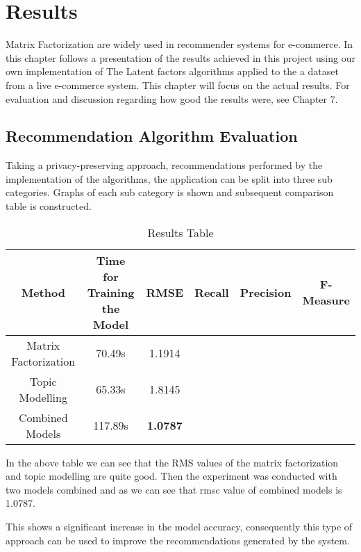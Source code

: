 \chapter{Results}
Matrix Factorization are widely used in recommender systems for e-commerce. In this chapter follows a presentation of the results achieved in this project using our own implementation of The Latent factors algorithms applied to the a dataset from a live e-commerce system. This chapter will focus on the actual results. For evaluation and discussion regarding how good the results were, see Chapter 7.

\section{Recommendation Algorithm Evaluation}
Taking a privacy-preserving approach, recommendations performed by the implementation of the algorithms, the application can be split into three sub categories. Graphs of each sub category is shown and subsequent comparison table is constructed.


\begin{table}[h]
\centering
\begin{tabular}{| c | c | c | c | c | c |}
\hline
\textbf{Method} & \textbf{Time for Training the Model} & \textbf{RMSE} & \textbf{Recall} & \textbf{Precision} & \textbf{F-Measure} \\
\hline
Matrix Factorization & 70.49s & 1.1914 &  &    &   \\
\hline
Topic Modelling & 65.33s & 1.8145 &  &  &  \\
\hline
Combined Models & 117.89s  & \textbf{1.0787} &  &  &  \\ 
\hline          
\end{tabular}
\caption{Results Table}
\label{Results Table}
\end{table}

In the above table we can see that the RMS values of the matrix factorization and topic modelling are quite good.
Then the experiment was conducted with two models combined and as we can see that rmsc value of combined models is 1.0787.

This shows a significant increase in the model accuracy, consequently this type of approach can be used to improve the recommendations generated by the system.

